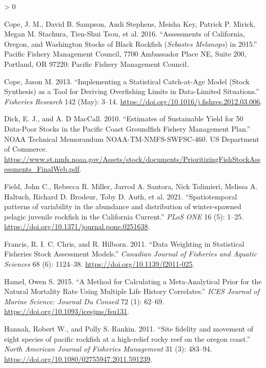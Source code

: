 \documentclass[11pt,
  english,
  a4paper,
]{article}
\newlength{\cslhangindent}
\newenvironment{CSLReferences}[2] %
 {%
  \setlength{\parindent}{0pt}
  \ifodd #1 \everypar{\setlength{\hangindent}{\cslhangindent}}\ignorespaces\fi
  \ifnum #2 > 0
  \setlength{\parskip}{#2\baselineskip}
  \fi
 }%
 {}
\begin{document}
\hypertarget{refs}{}
\begin{CSLReferences}{1}{0}
\leavevmode\hypertarget{ref-cope_assessments_2016}{}%
Cope, J. M., David B. Sampson, Andi Stephens, Meisha Key, Patrick P. Mirick, Megan M. Stachura, Tien-Shui Tsou, et al. 2016. {``Assessments of {California}, {Oregon}, and {Washington} Stocks of Black Rockfish (\emph{{Sebastes} Melanops}) in 2015.''} Pacific Fishery Management Council, 7700 Ambassador Place NE, Suite 200, Portland, OR 97220: Pacific Fishery Management Council.

\leavevmode\hypertarget{ref-cope_implementing_2013}{}%
Cope, Jason M. 2013. {``Implementing a Statistical Catch-at-Age Model (Stock Synthesis) as a Tool for Deriving Overfishing Limits in Data-Limited Situations.''} \emph{Fisheries Research} 142 (May): 3--14. \url{https://doi.org/10.1016/j.fishres.2012.03.006}.

\leavevmode\hypertarget{ref-dick_estimates_2010}{}%
Dick, E. J., and A. D MacCall. 2010. {``Estimates of Sustainable Yield for 50 Data-Poor Stocks in the Pacific Coast Groundfish Fishery Management Plan.''} NOAA Technical Memorandum NOAA-TM-NMFS-SWFSC-460. US Department of Commerce. \url{https://www.st.nmfs.noaa.gov/Assets/stock/documents/PrioritizingFishStockAssessments_FinalWeb.pdf}.

\leavevmode\hypertarget{ref-Field2021}{}%
Field, John C., Rebecca R. Miller, Jarrod A. Santora, Nick Tolimieri, Melissa A. Haltuch, Richard D. Brodeur, Toby D. Auth, et al. 2021. {``{Spatiotemporal patterns of variability in the abundance and distribution of winter-spawned pelagic juvenile rockfish in the California Current}.''} \emph{PLoS ONE} 16 (5): 1--25. \url{https://doi.org/10.1371/journal.pone.0251638}.

\leavevmode\hypertarget{ref-francis_data_2011}{}%
Francis, R. I. C. Chris, and R. Hilborn. 2011. {``Data Weighting in Statistical Fisheries Stock Assessment Models.''} \emph{Canadian Journal of Fisheries and Aquatic Sciences} 68 (6): 1124--38. \url{https://doi.org/10.1139/f2011-025}.

\leavevmode\hypertarget{ref-hamel_method_2015}{}%
Hamel, Owen S. 2015. {``A Method for Calculating a Meta-Analytical Prior for the Natural Mortality Rate Using Multiple Life History Correlates.''} \emph{ICES Journal of Marine Science: Journal Du Conseil} 72 (1): 62--69. \url{https://doi.org/10.1093/icesjms/fsu131}.

\leavevmode\hypertarget{ref-Hannah2011}{}%
Hannah, Robert W., and Polly S. Rankin. 2011. {``{Site fidelity and movement of eight species of pacific rockfish at a high-relief rocky reef on the oregon coast}.''} \emph{North American Journal of Fisheries Management} 31 (3): 483--94. \url{https://doi.org/10.1080/02755947.2011.591239}.


\end{CSLReferences}
\end{document}
